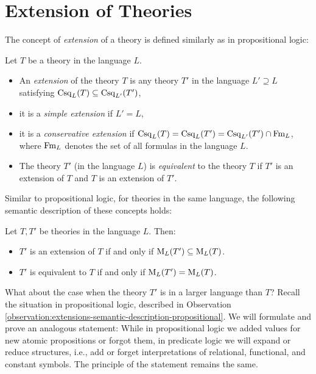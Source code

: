 \section{Extension of Theories}

The concept of \emph{extension} of a theory is defined similarly as in propositional logic:

\begin{definition}
    Let $T$ be a theory in the language $L$.
    \begin{itemize}
        \item An \emph{extension} of the theory $T$ is any theory $T'$ in the language $L'\supseteq L$ satisfying $\operatorname{Csq}_L(T)\subseteq\operatorname{Csq}_{L'}(T')$,
        \item it is a \emph{simple extension} if $L'=L$,
        \item it is a \emph{conservative extension} if $\operatorname{Csq}_L(T)=\operatorname{Csq}_L(T')=\operatorname{Csq}_{L'}(T')\cap \operatorname{Fm}_L$, where $\operatorname{Fm}_L$ denotes the set of all formulas in the language $L$.
        \item The theory $T'$ (in the language $L$) is \emph{equivalent} to the theory $T$ if $T'$ is an extension of $T$ and $T$ is an extension of $T'$.
    \end{itemize}
\end{definition}

Similar to propositional logic, for theories in the same language, the following semantic description of these concepts holds:

\begin{observation}
Let $T,T'$ be theories in the language $L$. Then:
\begin{itemize}
    \item $T'$ is an extension of $T$ if and only if $\operatorname{M}_L(T')\subseteq\operatorname{M}_L(T)$.
    \item $T'$ is equivalent to $T$ if and only if $\operatorname{M}_L(T')=\operatorname{M}_L(T)$.
\end{itemize}
\end{observation}

What about the case when the theory $T'$ is in a larger language than $T$? Recall the situation in propositional logic, described in Observation \ref{observation:extensions-semantic-description-propositional}. We will formulate and prove an analogous statement: While in propositional logic we added values for new atomic propositions or forgot them, in predicate logic we will expand or reduce structures, i.e., add or forget interpretations of relational, functional, and constant symbols. The principle of the statement remains the same.

